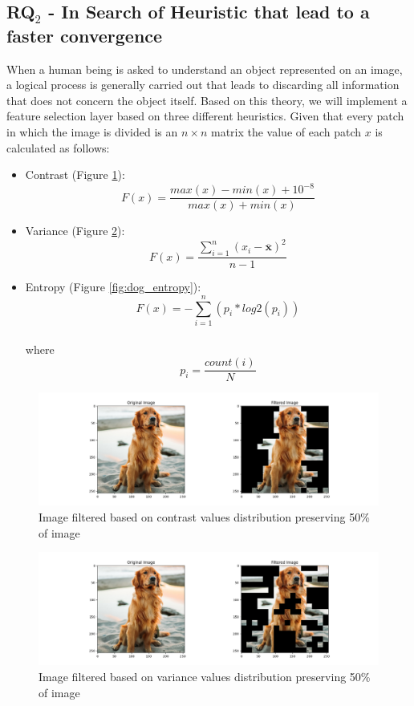 \subsection{\textbf{RQ$_{2}$} - In Search of Heuristic that lead to a faster convergence}
When a human being is asked to understand an object represented on an image, a logical process is generally carried out that leads to discarding all information that does not concern the object itself. Based on this theory, we will implement a feature selection layer based on three different heuristics.
Given that every patch in which the image is divided is an $n \times n$ matrix the value of each patch $x$ is calculated as follows:
\begin{itemize}
    \item Contrast (Figure \ref{fig:dog_contrast}):  $$F(x) =  \frac{max(x) - min(x) + 10^{-8}}{max(x) + min(x)}$$ 
   
    \item Variance (Figure \ref{fig:dog_variance}): $$F(x) =  \frac{\sum_{i=1}^n\left(x_i-\overline{\mathbf{x}}\right)^2}{n-1}$$
       
    \item Entropy (Figure \ref{fig:dog_entropy}): $$F(x) =  -\sum_{i=1}^{n}(p_i * log2(p_i))$$\\ where $$p_i = \frac{count(i)}{N}$$
        
\end{itemize}
    \begin{figure}[!htp]
        \centering
        \includegraphics[width=\columnwidth]{images/dog_contrast.png}
        \caption{Image filtered based on contrast values distribution preserving 50\% of image}
        \label{fig:dog_contrast}
    \end{figure}
     \begin{figure}[!htp]
        \centering
        \includegraphics[width=\columnwidth]{images/dog_variance.png}
        \caption{Image filtered based on variance values distribution preserving 50\% of image}
        \label{fig:dog_variance}
    \end{figure}
